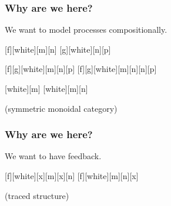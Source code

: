 \begin{frame}
    \frametitle{Why are we here?}

    \centering

    \LARGE
    We want to model processes \alert{compositionally}.

    \pause
    \normalsize
    \vspace{2em}

    [f][white][m][n]
    [g][white][n][p]

    \pause
    \vspace{2em}

    [f][g][white][m][n][p]
    [f][g][white][m][n][n][p]

    \pause

    [white][m]
    [white][m][n]

    \normalsize
    \vspace{1em}

    (\alert{symmetric monoidal category})

\end{frame}

\begin{frame}
    \frametitle{Why are we here?}

    \centering
    \LARGE
    We want to have \alert{feedback}.

    \pause
    \normalsize
    \vspace{2em}

    [f][white][x][m][x][n]
    \quad
    \pause
    \scalebox{2}{\(\Rightarrow\)}
    \quad
    [f][white][m][n][x]

    \pause
    \vspace{1em}
    (traced structure)

\end{frame}

